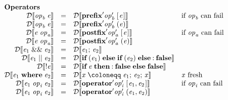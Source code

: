 \documentclass[acmsmall,screen]{acmart}\settopmatter{}
\newcommand{\Varid}[1]{\mathit{#1}}
\newcommand{\textquote}{'}
\newcommand{\De}[1]{{\mathcal D}\llbracket #1 \rrbracket}
\newcommand{\De}[1]{#1}
\newenvironment{figurebox}{\begin{figure}\begin{framed}}{\end{framed}\end{figure}}
\begin{document}
\begin{figurebox}
$$
\begin{array}{rcll}
  \multicolumn{1}{l}{\textbf{Operators}} \\
  \ensuremath{\De{ \Varid{op}_{\Varid{b}}\;\Varid{e}}} & = & \ensuremath{\De{ \textbf{prefix}\textquote \Varid{op}_{\Varid{b}}\textquote\;[\mskip1.5mu \Varid{e}\mskip1.5mu]}} & \text{if \ensuremath{\Varid{op}_{\Varid{b}}} can fail}\\
  \ensuremath{\De{ \Varid{op}_{\Varid{b}}\;\Varid{e}}} & = & \ensuremath{\De{ \textbf{prefix}\textquote \Varid{op}_{\Varid{b}}\textquote\;(\Varid{e})}} \\
  \ensuremath{\De{ \Varid{e}\;\Varid{op}_{\Varid{a}}}} & = & \ensuremath{\De{ \textbf{postfix}\textquote \Varid{op}_{\Varid{a}}\textquote\;[\mskip1.5mu \Varid{e}\mskip1.5mu]}} & \text{if \ensuremath{\Varid{op}_{\Varid{a}}} can fail}\\
  \ensuremath{\De{ \Varid{e}\;\Varid{op}_{\Varid{a}}}} & = & \ensuremath{\De{ \textbf{postfix}\textquote \Varid{op}_{\Varid{a}}\textquote\;(\Varid{e})}} \\
  \ensuremath{\De{ \Varid{e}_{\mathrm{1}}\;\&\&\;\Varid{e}_{\mathrm{2}}}} & = & \ensuremath{\De{ \Varid{e}_{\mathrm{1}};\,\Varid{e}_{\mathrm{2}}}} \\
  \ensuremath{\De{ \Varid{e}_{\mathrm{1}}\;||\;\Varid{e}_{\mathrm{2}}}} & = & \ensuremath{\De{ \textbf{if}\;(\Varid{e}_{\mathrm{1}})\;\textbf{else}\;\textbf{if}\;(\Varid{e}_{\mathrm{2}})\;\textbf{else}\mathbin{:}\textbf{false}}} \\
  \ensuremath{\De{ \mathbin{!}\Varid{e}}} & = & \ensuremath{\De{ \textbf{if}\;\Varid{e}\;\textbf{then}\mathbin{:}\textbf{false}\;\textbf{else}\;\textbf{false}}} \\
  \ensuremath{\De{ \Varid{e}_{\mathrm{1}}\;\mathbf{where}\;\Varid{e}_{\mathrm{2}}}} & = & \ensuremath{\De{ \Varid{x}\mathrel{\coloneqq}\Varid{e}_{\mathrm{1}};\,\Varid{e}_{\mathrm{2}};\,\Varid{x}}} & \text{\ensuremath{\Varid{x}} fresh} \\
  \ensuremath{\De{ \Varid{e}_{\mathrm{1}}\;\Varid{op}_{\Varid{i}}\;\Varid{e}_{\mathrm{2}}}} & = & \ensuremath{\De{ \textbf{operator}\textquote \Varid{op}_{\Varid{i}}\textquote\;[\mskip1.5mu \Varid{e}_{\mathrm{1}},\Varid{e}_{\mathrm{2}}\mskip1.5mu]}} & \text{if \ensuremath{\Varid{op}_{\Varid{i}}} can fail}\\
  \ensuremath{\De{ \Varid{e}_{\mathrm{1}}\;\Varid{op}_{\Varid{i}}\;\Varid{e}_{\mathrm{2}}}} & = & \ensuremath{\De{ \textbf{operator}\textquote \Varid{op}_{\Varid{i}}\textquote\;(\Varid{e}_{\mathrm{1}},\Varid{e}_{\mathrm{2}})}} \\

\end{array}$$
\end{figurebox}
\end{document}
